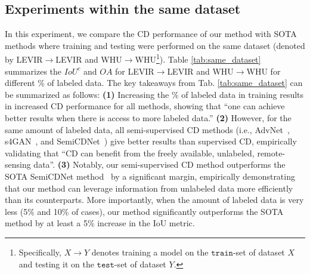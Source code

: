 \documentclass[runningheads]{llncs}
\begin{document}
\vspace{-4mm}
\subsection{Experiments within the same dataset}
\label{sec:same_dataset}
In this experiment, we compare the CD performance of our method with SOTA methods where training and testing were performed on the same dataset (denoted by LEVIR$\rightarrow$LEVIR and WHU$\rightarrow$WHU\footnote[1]{Specifically, $X$$\rightarrow$$Y$ denotes training a model on the  $\texttt{train}$-set of dataset $X$ and testing it on the $\texttt{test}$-set of dataset $Y$.}). Table \ref{tab:same_dataset} summarizes the $IoU^c$ and $OA$ for LEVIR$\rightarrow$LEVIR and WHU$\rightarrow$WHU for different \% of labeled data. The key takeaways from Tab. \ref{tab:same_dataset} can be summarized as follows: \textbf{(1)} Increasing the \% of labeled data in training results in increased CD performance for all methods, showing that ``one can achieve better results when there is access to more labeled data.'' \textbf{(2)} However, for the same amount of labeled data, all semi-supervised CD methods (i.e., AdvNet~\cite{advnet}, s4GAN~\cite{s4GAN}, and SemiCDNet~\cite{SemiCDNet}) give better results than supervised CD, empirically validating that ``CD can benefit from the freely available, unlabeled, remote-sensing data''. \textbf{(3)} Notably, our semi-supervised CD method outperforms the SOTA SemiCDNet method~\cite{SemiCDNet} by a significant margin, empirically demonstrating that our method can leverage information from unlabeled data more efficiently than its counterparts. More importantly, when the amount of labeled data is very less (5\% and 10\% of cases), our method significantly outperforms the SOTA method by at least a 5\% increase in the IoU metric.
\end{document}
